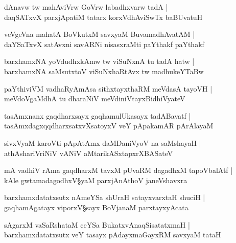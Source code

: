 \begin{shloka}
dAnavw tw mahAviVrw GoVrw labadhxvarw tadA |\\
daqSATxvX parxjApatiM tatarx korxVdhAviSwTx baBUvatuH 
\end{shloka}

\begin{shloka}
veVgeVna mahatA BoVkutxM savxyaM BuvamadhAvatAM |\\
daYSaTxvX satAvxni savARNi nisasxraMti paYthakf paYthakf
\end{shloka}

\begin{shloka}
barxhamxNA yoVdudhxkAmw tw viSuNxnA tu tadA hatw |\\
barxhamxNA saMsutxtoV viSuNxhaRtAvx tw madhukeYTaBw
\end{shloka}

\begin{shloka}
paYthiviVM vadhaRyAmAsa sithxtayxthaRM meVdasA tayoVH |\\
meVdoVgaMdhA tu dharaNiV meVdiniVtayxBidhiVyateV
\end{shloka}

\begin{shloka}
tasAmxnanx gaqdharxsayx gaqhamulUkasayx tadABavatf |\\
tasAmxdagxqqdharxsatxvXsatoyxV veY pApakamAR pArAlayaM 
\end{shloka}

\begin{shloka}
sivxVyaM karoVti pApAtAmx daMDaniVyoV na saMshayaH |\\
athAshariVriNiV vANiV aMtarikASxtapxrXBASateV 
\end{shloka}

\begin{shloka}
mA vadhiV rAma gaqdharxM tavxM pUvaRM dagadhxM tapoVbalAtf |\\
kAle gwtamadagodhxV\S yaM parxjAnAthoV janeVshavxra
\end{shloka}

\begin{shloka}
barxhamxdatatxsutx nAmeYSa shUraH satayxvarxtaH shuciH |\\
gaqhamAgatayx viporxV\S sayx BoVjanaM parxtayxyAcata
\end{shloka}

\begin{shloka}
sAgarxM vaSaRshataM ceYSa BukatxvAnaqSisatatxmaH |\\
barxhamxdatatxsutx veY tasayx pAdayxmaGayxRM savxyaM tataH 
\end{shloka}

